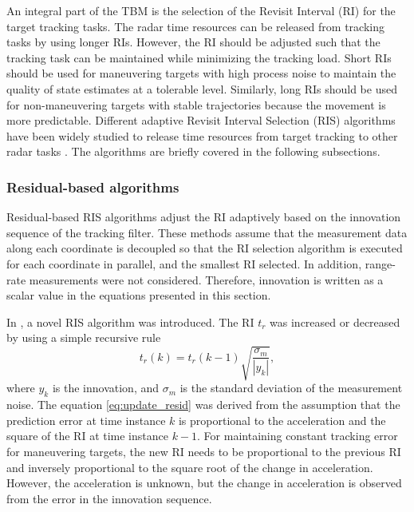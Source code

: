 \documentclass[english, 12pt, a4paper, elec, utf8, a-1b, online]{aaltothesis}
\numberwithin{equation}{section}
\newcommand{\ri}{t_r}
\begin{document}
An integral part of the TBM is the selection of the Revisit Interval (RI) for the target tracking tasks.
The radar time resources can be released from tracking tasks by using longer RIs. 
However, the RI should be adjusted such that the tracking task can be maintained while minimizing the tracking load.
Short RIs should be used for maneuvering targets with high process noise to maintain the quality of state estimates at a tolerable level. 
Similarly, long RIs should be used for non-maneuvering targets with stable trajectories because the movement is more predictable.
Different adaptive Revisit Interval Selection (RIS) algorithms have been widely studied to release time resources from target tracking to other radar tasks \cite{Cohen1986, Gardner1988, Munu1992, ChengTing2007,Baek2010, Keuk1975, Watson1993, vanKeuk1993, Daeipour1994, Shin1995, Benoudnine2006, MasoumiGanjgah2017, Charlish2015}.
The algorithms are briefly covered in the following subsections.

\subsubsection{Residual-based algorithms}

Residual-based RIS algorithms adjust the RI adaptively based on the innovation sequence of the tracking filter.
These methods assume that the measurement data along each coordinate is decoupled so that the RI selection algorithm is executed for each coordinate in parallel, and the smallest RI selected.
In addition, range-rate measurements were not considered.
Therefore, innovation is written as a scalar value in the equations presented in this section.

In \cite{Cohen1986}, a novel RIS algorithm was introduced.
The RI $\ri$ was increased or decreased by using a simple recursive rule 
\begin{equation}\label{eq:update_resid}
    \ri(k) = \ri(k-1)\sqrt{\frac{\sigma_m}{|y_k|}},
\end{equation}
where $y_k$ is the innovation, and $\sigma_m$ is the standard deviation of the measurement noise.
The equation \eqref{eq:update_resid} was derived from the assumption that the prediction error at time instance $k$ is proportional to the acceleration and the square of the RI at time instance $k-1$.
For maintaining constant tracking error for maneuvering targets, the new RI needs to be proportional to the previous RI and inversely proportional to the square root of the change in acceleration.
However, the acceleration is unknown, but the change in acceleration is observed from the error in the innovation sequence.
\end{document}
